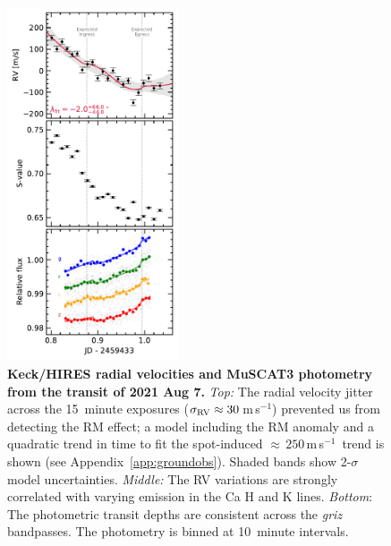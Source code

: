 \documentclass[12pt,modern,twocolumn,tighten,linenumbers]{aastex63}
\newcommand{\ms}{\,m\,s$^{-1}$}
\begin{document}
\begin{figure}[tp]
	\begin{center}
		\leavevmode
		\includegraphics[width=0.45\textwidth]{f7.pdf}
	\end{center}
	\vspace{-0.7cm}
	\caption{
		{\bf Keck/HIRES radial velocities and MuSCAT3 photometry from the transit of 2021 Aug 7.}
		{\it Top:} 
		The radial velocity jitter across the 15~minute exposures
		($\sigma_{\rm RV}\approx30$\ms) prevented us from detecting the RM
		effect;
		a model including the RM anomaly and a quadratic trend in time to
		fit the spot-induced $\approx$\,$250$\ms\ trend is shown (see
		Appendix~\ref{app:groundobs}).  Shaded bands show 2-$\sigma$ model
		uncertainties.  
		{\it Middle:} The RV variations are strongly correlated with varying
		emission in the Ca H and K lines.
		{\it Bottom}: The photometric transit depths are consistent across
		the {\it griz} bandpasses. The photometry is binned at 10~minute
		intervals.
		\label{fig:ground}
	}
\end{figure}
\end{document}
